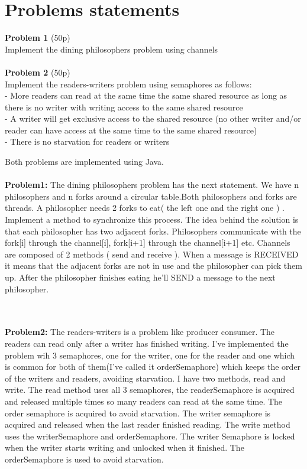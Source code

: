 \documentclass[14pt]{article}
\begin{document}
\section*{Problems statements}
\vspace{20 mm}
\textbf{Problem 1} (50p) \\
Implement the dining philosophers problem using channels
\\\vspace{10 mm}\\
\textbf{Problem 2} (50p) \\
Implement the readers-writers problem using semaphores
as follows:\\
- More readers can read at the same time the same shared resource as long as
there is no writer with writing access to the same shared resource\\
- A writer will get exclusive access to the shared resource (no other writer and/or reader can have access at the same time to the same shared resource)\\
- There is no starvation for readers or writers
\begin{center}
\end{center}
\newpage
Both problems are implemented using Java.
\\\vspace{10 mm}\\
\textbf{Problem1:} The dining philosophers problem has the next statement. We have n philosophers and n forks around a circular table.Both philosophers and forks are threads. A philosopher needs 2 forks to eat( the left one and the right one ) . Implement a method to synchronize this process. The idea behind the solution is that each philosopher has two adjacent forks. Philosophers communicate with the fork[i] through the channel[i], fork[i+1] through the channel[i+1] etc. Channels are composed of 2 methods ( send and receive ). When a message is RECEIVED it means that the adjacent forks are not in use and the philosopher can pick them up. After the philosopher finishes eating he'll SEND a message to the next philosopher.

\\\vspace{20 mm}\\
\textbf{Problem2:} The readers-writers is a problem like producer consumer. The readers can read only after a writer has finished writing. I've implemented the problem wih 3 semaphores, one for the writer, one for the reader and one which is common for both of them(I've called it orderSemaphore) which keeps the order of the writers and readers, avoiding starvation. I have two methods, read and write. The read method uses all 3 semaphores, the readerSemaphore is acquired and released multiple times so many readers can read at the same time. The order semaphore is acquired to avoid starvation. The writer semaphore is acquired and released when the last reader finished reading. The write method uses the writerSemaphore and orderSemaphore. The writer Semaphore is locked when the writer starts writing and unlocked when it finished. The orderSemaphore is used to avoid starvation.
\end{document}
